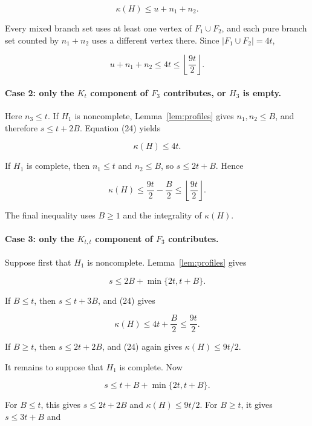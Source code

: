 \documentclass[11pt]{article}
\begin{document}
\nopagebreak[4]
\[
\kappa(H)\leq u+n_1+n_2.
\]

Every mixed branch set uses at least one vertex of $F_1\cup F_2$, and each
pure branch set counted by $n_1+n_2$ uses a different vertex there. Since
$|F_1\cup F_2|=4t$,

\nopagebreak[4]
\[
u+n_1+n_2\leq4t
\leq\left\lfloor\frac{9t}{2}\right\rfloor.                 \tag{25}
\]

\paragraph{Case 2: only the $K_t$ component of $F_3$ contributes, or $H_3$ is empty.}


Here $n_3\leq t$. If $H_1$ is noncomplete, Lemma~\ref{lem:profiles} gives
$n_1,n_2\leq B$, and therefore $s\leq t+2B$. Equation (24) yields

\nopagebreak[4]
\[
\kappa(H)\leq4t.                                           \tag{26}
\]

If $H_1$ is complete, then $n_1\leq t$ and $n_2\leq B$, so
$s\leq2t+B$. Hence

\nopagebreak[4]
\[
\kappa(H)\leq\frac{9t}{2}-\frac B2
\leq\left\lfloor\frac{9t}{2}\right\rfloor.                \tag{27}
\]

The final inequality uses $B\geq1$ and the integrality of $\kappa(H)$.

\paragraph{Case 3: only the $K_{t,t}$ component of $F_3$ contributes.}


Suppose first that $H_1$ is noncomplete. Lemma~\ref{lem:profiles} gives

\nopagebreak[4]
\[
s\leq2B+\min\{2t,t+B\}.                                    \tag{28}
\]

If $B\leq t$, then $s\leq t+3B$, and (24) gives

\nopagebreak[4]
\[
\kappa(H)\leq4t+\frac B2\leq\frac{9t}{2}.
\]

If $B\geq t$, then $s\leq2t+2B$, and (24) again gives
$\kappa(H)\leq9t/2$.

It remains to suppose that $H_1$ is complete. Now

\nopagebreak[4]
\[
s\leq t+B+\min\{2t,t+B\}.                                  \tag{29}
\]

For $B\leq t$, this gives $s\leq2t+2B$ and
$\kappa(H)\leq9t/2$. For $B\geq t$, it gives $s\leq3t+B$ and
\end{document}
